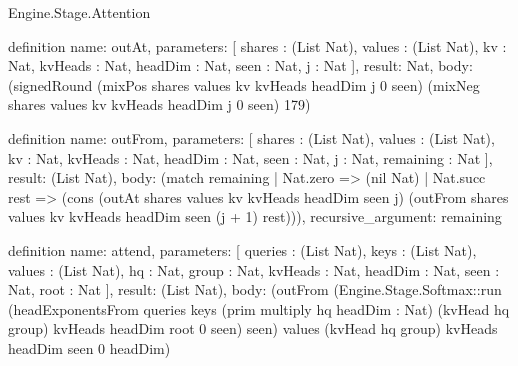 \begin{lexlean}{Engine.Stage.Attention}
\begin{semanticmodule}
definition{
  name: outAt,
  parameters: [
    shares : (List Nat),
    values : (List Nat),
    kv : Nat,
    kvHeads : Nat,
    headDim : Nat,
    seen : Nat,
    j : Nat
  ],
  result: Nat,
  body: (signedRound (mixPos shares values kv kvHeads headDim j 0 seen) (mixNeg shares values kv kvHeads headDim j 0 seen) 179)
}

definition{
  name: outFrom,
  parameters: [
    shares : (List Nat),
    values : (List Nat),
    kv : Nat,
    kvHeads : Nat,
    headDim : Nat,
    seen : Nat,
    j : Nat,
    remaining : Nat
  ],
  result: (List Nat),
  body: (match remaining
    | Nat.zero => (nil Nat)
    | Nat.succ rest => (cons (outAt shares values kv kvHeads headDim seen j) (outFrom shares values kv kvHeads headDim seen (j + 1) rest))),
  recursive_argument: remaining
}

definition{
  name: attend,
  parameters: [
    queries : (List Nat),
    keys : (List Nat),
    values : (List Nat),
    hq : Nat,
    group : Nat,
    kvHeads : Nat,
    headDim : Nat,
    seen : Nat,
    root : Nat
  ],
  result: (List Nat),
  body: (outFrom (Engine.Stage.Softmax::run (headExponentsFrom queries keys (prim multiply hq headDim : Nat) (kvHead hq group) kvHeads headDim root 0 seen) seen) values (kvHead hq group) kvHeads headDim seen 0 headDim)
}
\end{semanticmodule}
\end{lexlean}
